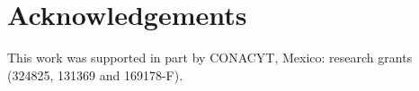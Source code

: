 \section{Acknowledgements}
This work was supported in part by CONACYT, Mexico: research grants (324825, 131369 and 169178-F).

